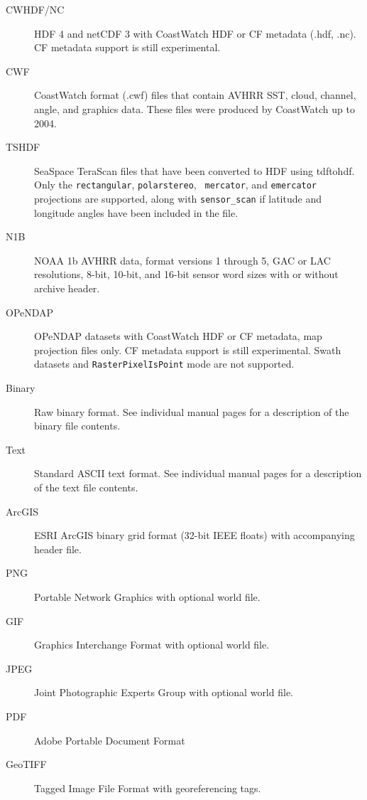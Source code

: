 \begin{description}

  \item[CWHDF/NC] HDF 4 and netCDF 3 with CoastWatch HDF or CF
  metadata (.hdf, .nc).  CF metadata support is still experimental.

  \item[CWF] CoastWatch format (.cwf) files that contain AVHRR SST, cloud,
  channel, angle, and graphics data.  These files were produced by
  CoastWatch up to 2004.

  \item[TSHDF] SeaSpace TeraScan files that have been converted to HDF
  using tdftohdf.  Only the {\tt rectangular}, {\tt polarstereo}, {\tt
  mercator}, and {\tt emercator} projections are supported, along with
  {\tt sensor\_scan} if latitude and longitude angles have been
  included in the file.

  \item[N1B] NOAA 1b AVHRR data, format versions 1 through 5, GAC or LAC
  resolutions, 8-bit, 10-bit, and 16-bit sensor word sizes with or
  without archive header.

  \item[OPeNDAP] OPeNDAP datasets with CoastWatch HDF or CF metadata,
  map projection files only.  CF metadata support is still
  experimental.  Swath datasets and {\tt RasterPixelIsPoint} mode are
  not supported.

  \item[Binary] Raw binary format.  See individual manual pages for a
  description of the binary file contents.

  \item[Text] Standard ASCII text format.  See individual manual pages
  for a description of the text file contents.

  \item[ArcGIS] ESRI ArcGIS binary grid format (32-bit IEEE floats) with
  accompanying header file.

  \item[PNG] Portable Network Graphics with optional world file.

  \item[GIF] Graphics Interchange Format with optional world file.

  \item[JPEG] Joint Photographic Experts Group with optional world file.

  \item[PDF] Adobe Portable Document Format

  \item[GeoTIFF] Tagged Image File Format with georeferencing tags.

\end{description}
